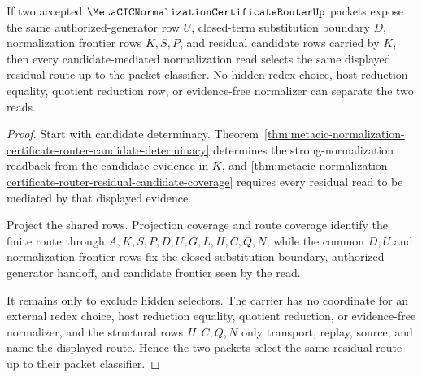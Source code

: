 \begin{theorem}
\label{thm:metacic-normalization-certificate-router-residual-determinacy}
If two accepted $\MetaCICNormalizationCertificateRouterUp$ packets expose the same authorized-generator row $U$, closed-term substitution boundary $D$, normalization frontier rows $K,S,P$, and residual candidate rows carried by $K$, then every candidate-mediated normalization read selects the same displayed residual route up to the packet classifier. No hidden redex choice, host reduction equality, quotient reduction row, or evidence-free normalizer can separate the two reads.
\end{theorem}
\begin{proof}
Start with candidate determinacy. Theorem~\ref{thm:metacic-normalization-certificate-router-candidate-determinacy} determines the strong-normalization readback from the candidate evidence in $K$, and \autoref{thm:metacic-normalization-certificate-router-residual-candidate-coverage} requires every residual read to be mediated by that displayed evidence.

Project the shared rows. Projection coverage and route coverage identify the finite route through $A,K,S,P,D,U,G,L,H,C,Q,N$, while the common $D,U$ and normalization-frontier rows fix the closed-substitution boundary, authorized-generator handoff, and candidate frontier seen by the read.

It remains only to exclude hidden selectors. The carrier has no coordinate for an external redex choice, host reduction equality, quotient reduction, or evidence-free normalizer, and the structural rows $H,C,Q,N$ only transport, replay, source, and name the displayed route. Hence the two packets select the same residual route up to their packet classifier.
\end{proof}

